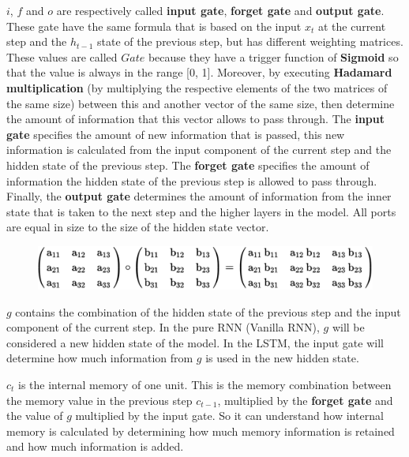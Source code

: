 $i$, $f$ and $o$ are respectively called \textbf{input gate}, \textbf{forget gate} and \textbf{output gate}. These gate have the same formula that is based on the input $x_{t}$ at the current step and the $h_{t-1}$ state of the previous step, but has different weighting matrices. These values are called $Gate$ because they have a trigger function of \textbf{Sigmoid} so that the value is always in the range [0, 1]. Moreover, by executing \textbf{Hadamard multiplication} (by multiplying the respective elements of the two matrices of the same size) between this and another vector of the same size, then determine the amount of information that this vector allows to pass through. The \textbf{input gate} specifies the amount of new information that is passed, this new information is calculated from the input component of the current step and the hidden state of the previous step. The \textbf{forget gate} specifies the amount of information the hidden state of the previous step is allowed to pass through. Finally, the \textbf{output gate} determines the amount of information from the inner state that is taken to the next step and the higher layers in the model. All ports are equal in size to the size of the hidden state vector.
\begin{center}
  \begin{figure}[H]
  \centering
  \includegraphics[width=0.8\columnwidth]{images/chap2/Hadamard.png}
  \label{chap2:WSP}
  \end{figure}
\end{center}
\vspace{-1cm}
$g$ contains the combination of the hidden state of the previous step and the input component of the current step. In the pure RNN (Vanilla RNN), $g$ will be considered a new hidden state of the model. In the LSTM, the input gate will determine how much information from $g$ is used in the new hidden state.

$c_{t}$ is the internal memory of one unit. This is the memory combination between the memory value in the previous step $c_{t-1}$, multiplied by the \textbf{forget gate} and the value of $g$ multiplied by the input gate. So it can understand how internal memory is calculated by determining how much memory information is retained and how much information is added.

